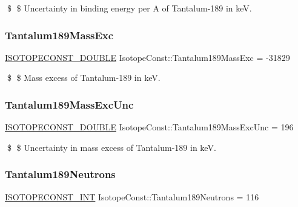 \$ \$ Uncertainty in binding energy per A of Tantalum-\/189 in keV. \mbox{\label{group___isotope_const-_tantalum-_ta189_ga3fe05112cd441eb26b385f8dd82c5c62}} 
\subsubsection{\texorpdfstring{Tantalum189\+Mass\+Exc}{Tantalum189MassExc}}
{\footnotesize\ttfamily \mbox{\hyperlink{group___isotope_const-_macros_ga8f45a7272ce02c0b4c65c44636ed719a}{I\+S\+O\+T\+O\+P\+E\+C\+O\+N\+S\+T\+\_\+\+D\+O\+U\+B\+LE}} Isotope\+Const\+::\+Tantalum189\+Mass\+Exc = -\/31829}

\$ \$ Mass excess of Tantalum-\/189 in keV. \mbox{\label{group___isotope_const-_tantalum-_ta189_ga9eefdbcdd450fb5c732c46bc7afbb259}} 
\subsubsection{\texorpdfstring{Tantalum189\+Mass\+Exc\+Unc}{Tantalum189MassExcUnc}}
{\footnotesize\ttfamily \mbox{\hyperlink{group___isotope_const-_macros_ga8f45a7272ce02c0b4c65c44636ed719a}{I\+S\+O\+T\+O\+P\+E\+C\+O\+N\+S\+T\+\_\+\+D\+O\+U\+B\+LE}} Isotope\+Const\+::\+Tantalum189\+Mass\+Exc\+Unc = 196}

\$ \$ Uncertainty in mass excess of Tantalum-\/189 in keV. \mbox{\label{group___isotope_const-_tantalum-_ta189_gab7aae6b70fcade9e9dac8dedadf05358}} 
\subsubsection{\texorpdfstring{Tantalum189\+Neutrons}{Tantalum189Neutrons}}
{\footnotesize\ttfamily \mbox{\hyperlink{group___isotope_const-_macros_ga5f18360b3e99483a35c32d789e62621c}{I\+S\+O\+T\+O\+P\+E\+C\+O\+N\+S\+T\+\_\+\+I\+NT}} Isotope\+Const\+::\+Tantalum189\+Neutrons = 116}

